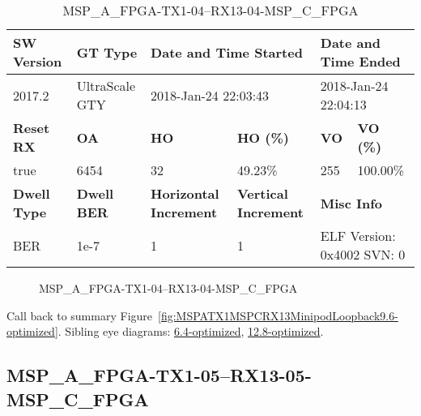 \begin{table}[h]
\centering
\caption{MSP\_A\_FPGA-TX1-04--RX13-04-MSP\_C\_FPGA}
\label{tab:MSPAFPGATX104RX1304MSPCFPGA9.6-optimized}
\begin{tabular}{@{}|l|l|l|l|l|l|@{}}
\toprule
\textbf{SW Version}                & \textbf{GT Type}   & \multicolumn{2}{l|}{\textbf{Date and Time Started}}            & \multicolumn{2}{l|}{\textbf{Date and Time Ended}}        \\ \midrule
2017.2                       & UltraScale GTY          & \multicolumn{2}{l|}{2018-Jan-24 22:03:43}                   & \multicolumn{2}{l|}{2018-Jan-24 22:04:13}               \\ \midrule
\textbf{Reset RX}                  & \textbf{OA} & \textbf{HO}   & \textbf{HO (\%)} & \textbf{VO} & \textbf{VO (\%)} \\ \midrule
true & 6454        & 32          & 49.23\%        & 255        & 100.00\%       \\ \midrule
\textbf{Dwell Type}                & \textbf{Dwell BER} & \textbf{Horizontal Increment} & \textbf{Vertical Increment}    & \multicolumn{2}{l|}{\textbf{Misc Info}}                  \\ \midrule
BER                            & 1e-7        & 1        & 1           & \multicolumn{2}{l|}{ELF Version: 0x4002 SVN: 0}                         \\ \bottomrule
\end{tabular}
\end{table}

\begin{figure}[h]
\caption{MSP\_A\_FPGA-TX1-04--RX13-04-MSP\_C\_FPGA} \label{fig:MSPAFPGATX104RX1304MSPCFPGA9.6-optimized}
\end{figure}

Call back to summary Figure~\ref{fig:MSPATX1MSPCRX13MinipodLoopback9.6-optimized}.
Sibling eye diagrams: \hyperref[sec:MSPAFPGATX104RX1304MSPCFPGA6.4-optimized]{6.4-optimized}, \hyperref[sec:MSPAFPGATX104RX1304MSPCFPGA12.8-optimized]{12.8-optimized}.

\clearpage
\newpage


\subsection{MSP\_A\_FPGA-TX1-05--RX13-05-MSP\_C\_FPGA}\label{sec:MSPAFPGATX105RX1305MSPCFPGA9.6-optimized}

